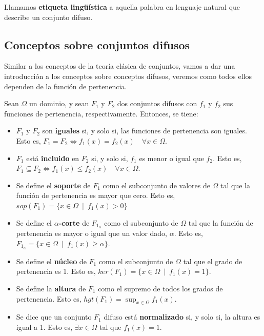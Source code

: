 \begin{definition}
Llamamos \textbf{etiqueta lingüística} a aquella palabra en lenguaje natural que describe un conjunto difuso.
\end{definition}

\subsection{Conceptos sobre conjuntos difusos}

Similar a los conceptos de la teoría clásica de conjuntos, vamos a dar una introducción a los conceptos sobre conceptos difusos, veremos como todos ellos dependen de la función de pertenencia.

Sean $\Omega$ un dominio, y sean $F_1$ y $F_2$ dos conjuntos difusos con $f_1$ y $f_2$ sus funciones de pertenencia, respectivamente. Entonces, se tiene:

\begin{itemize}
    \item $F_1$ y $F_2$ son \textbf{iguales} si, y solo si, las funciones de pertenencia son iguales. Esto es, $F_1 = F_2 \Leftrightarrow f_1(x) = f_2(x) \quad \forall x \in \Omega$.
    \item $F_1$ está \textbf{incluido} en $F_2$ si, y solo si, $f_1$ es menor o igual que $f_2$. Esto es, $F_1 \subseteq F_2 \Leftrightarrow f_1(x) \leq f_2(x) \quad \forall x \in \Omega$.
    \item Se define el \textbf{soporte} de $F_1$ como el subconjunto de valores de $\Omega$ tal que la función de pertenencia es mayor que cero. Esto es, $sop(F_1) = \{ x \in \Omega \enspace | \enspace f_1(x) > 0 \}$
    \item Se define el \textbf{$\alpha$-corte} de $F_{1_\alpha}$ como el subconjunto de $\Omega$ tal que la función de pertenencia es mayor o igual que un valor dado, $\alpha$. Esto es, $F_{1_\alpha} = \{ x \in \Omega \enspace | \enspace f_1(x) \geq \alpha \}$.
    \item Se define el \textbf{núcleo} de $F_1$ como el subconjunto de $\Omega$ tal que el grado de pertenencia es 1. Esto es, $ker(F_1) = \{ x\in \Omega \enspace | \enspace f_1(x) = 1 \}$.
    \item Se define la \textbf{altura} de $F_1$ como el supremo de todos los grados de pertenencia. Esto es, $hgt(F_1) = \sup_{x\in \Omega} f_1(x)$.
    \item Se dice que un conjunto $F_1$ difuso está \textbf{normalizado} si, y solo si, la altura es igual a 1. Esto es, $\exists x \in \Omega$ tal que $f_1(x) = 1$.
\end{itemize}

